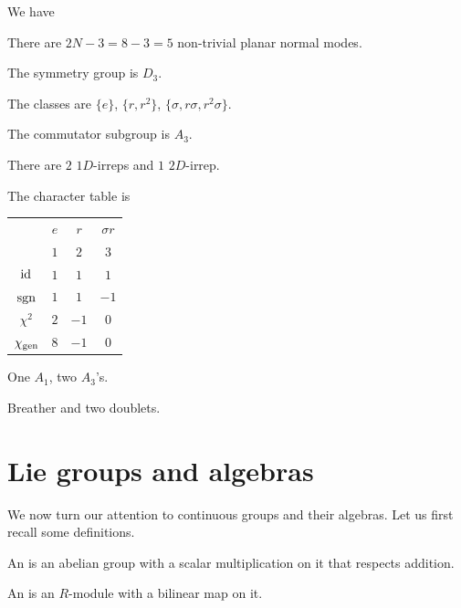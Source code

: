 \documentclass[11pt]{article}
\begin{document}
\begin{eexample}
    We have
    \begin{itemize}
        \item There are $2N - 3 = 8 - 3 = 5$ non-trivial planar normal modes.
        \item The symmetry group is $D_3$.
        \item The classes are $\{ e \}$, $\{ r, r^2 \}$, $\{ \sigma, r \sigma, r^2 \sigma \}$.
        \item The commutator subgroup is $A_3$.
        \item There are $2$ $1D$-irreps and $1$ $2D$-irrep.
        \item The character table is
        \begin{table}[H]
            \centering
            \begin{tabular}{|c|c|c|c|}
                \hline
                 & $e$ & $r$ & $\sigma r$\\
                 & $1$ & $2$ & $3$\\
                \hline
                $\operatorname{id}$ & $1$ & $1$ & $1$\\
                $\operatorname{sgn}$ & $1$ & $1$ & $-1$\\
                $\chi^2$ & $2$ & $-1$ & $0$\\
                $\chi_{\rm gen}$ & $8$ & $-1$ & $0$\\
                \hline
            \end{tabular}
            \item One $A_1$, two $A_3$'s.
            \item Breather and two doublets.
        \end{table}
    \end{itemize}
\end{eexample}

\section{Lie groups and algebras}

We now turn our attention to continuous groups
and their algebras. Let us first recall some definitions.

\begin{definition}
    An  is an abelian group with a scalar
    multiplication on it that respects addition.
\end{definition}

\begin{definition}
    An  is an $R$-module with a bilinear
    map on it.
\end{definition}
\end{document}
